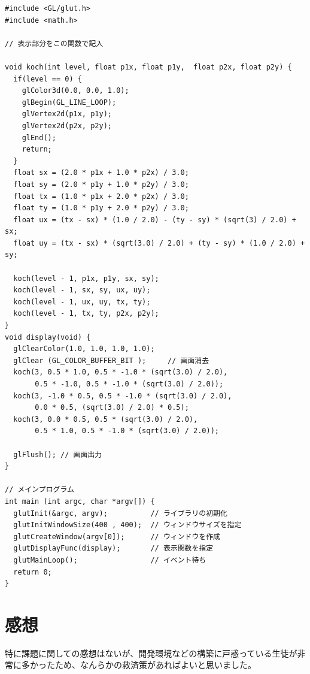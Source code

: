 \documentclass{scrartcl}
\begin{document}
\begin{verbatim}
#include <GL/glut.h>
#include <math.h>

// 表示部分をこの関数で記入

void koch(int level, float p1x, float p1y,  float p2x, float p2y) {
  if(level == 0) {
    glColor3d(0.0, 0.0, 1.0);
    glBegin(GL_LINE_LOOP);
    glVertex2d(p1x, p1y);
    glVertex2d(p2x, p2y);
    glEnd();
    return;
  }
  float sx = (2.0 * p1x + 1.0 * p2x) / 3.0;
  float sy = (2.0 * p1y + 1.0 * p2y) / 3.0;
  float tx = (1.0 * p1x + 2.0 * p2x) / 3.0;
  float ty = (1.0 * p1y + 2.0 * p2y) / 3.0;
  float ux = (tx - sx) * (1.0 / 2.0) - (ty - sy) * (sqrt(3) / 2.0) + sx;
  float uy = (tx - sx) * (sqrt(3.0) / 2.0) + (ty - sy) * (1.0 / 2.0) + sy;

  koch(level - 1, p1x, p1y, sx, sy);
  koch(level - 1, sx, sy, ux, uy);
  koch(level - 1, ux, uy, tx, ty);
  koch(level - 1, tx, ty, p2x, p2y);
}
void display(void) {
  glClearColor(1.0, 1.0, 1.0, 1.0);
  glClear (GL_COLOR_BUFFER_BIT );     // 画面消去
  koch(3, 0.5 * 1.0, 0.5 * -1.0 * (sqrt(3.0) / 2.0),
       0.5 * -1.0, 0.5 * -1.0 * (sqrt(3.0) / 2.0));
  koch(3, -1.0 * 0.5, 0.5 * -1.0 * (sqrt(3.0) / 2.0),
       0.0 * 0.5, (sqrt(3.0) / 2.0) * 0.5);
  koch(3, 0.0 * 0.5, 0.5 * (sqrt(3.0) / 2.0),
       0.5 * 1.0, 0.5 * -1.0 * (sqrt(3.0) / 2.0));

  glFlush(); // 画面出力
}

// メインプログラム
int main (int argc, char *argv[]) { 
  glutInit(&argc, argv);          // ライブラリの初期化
  glutInitWindowSize(400 , 400);  // ウィンドウサイズを指定
  glutCreateWindow(argv[0]);      // ウィンドウを作成
  glutDisplayFunc(display);       // 表示関数を指定
  glutMainLoop();                 // イベント待ち
  return 0;
}
\end{verbatim}


\section{感想}
\label{sec:orgc3b07da}
特に課題に関しての感想はないが、開発環境などの構築に戸惑っている生徒が非常に多かったため、なんらかの救済策があればよいと思いました。\\
\end{document}
